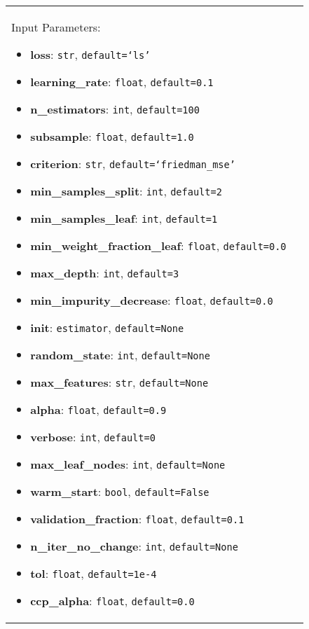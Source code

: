 \begin{longtable}{|l|p{12cm}|}
	Input Parameters:
	\begin{itemize}
		\item \textbf{loss}: \texttt{str}, \texttt{default=`ls'}
		\item \textbf{learning\_rate}: \texttt{float}, \texttt{default=0.1}
		\item \textbf{n\_estimators}: \texttt{int}, \texttt{default=100}
		\item \textbf{subsample}: \texttt{float}, \texttt{default=1.0}
		\item \textbf{criterion}: \texttt{str}, \texttt{default=`friedman\_mse'}
		\item \textbf{min\_samples\_split}: \texttt{int}, \texttt{default=2}
		\item \textbf{min\_samples\_leaf}: \texttt{int}, \texttt{default=1}
		\item \textbf{min\_weight\_fraction\_leaf}: \texttt{float}, \texttt{default=0.0}
		\item \textbf{max\_depth}: \texttt{int}, \texttt{default=3}
		\item \textbf{min\_impurity\_decrease}: \texttt{float}, \texttt{default=0.0}
		\item \textbf{init}: \texttt{estimator}, \texttt{default=None}
		\item \textbf{random\_state}: \texttt{int}, \texttt{default=None}
		\item \textbf{max\_features}: \texttt{str}, \texttt{default=None}
		\item \textbf{alpha}: \texttt{float}, \texttt{default=0.9}
		\item \textbf{verbose}: \texttt{int}, \texttt{default=0}
		\item \textbf{max\_leaf\_nodes}: \texttt{int}, \texttt{default=None}
		\item \textbf{warm\_start}: \texttt{bool}, \texttt{default=False}
		\item \textbf{validation\_fraction}: \texttt{float}, \texttt{default=0.1}
		\item \textbf{n\_iter\_no\_change}: \texttt{int}, \texttt{default=None}
		\item \textbf{tol}: \texttt{float}, \texttt{default=1e-4}
		\item \textbf{ccp\_alpha}: \texttt{float}, \texttt{default=0.0}
	\end{itemize}


\end{longtable}
